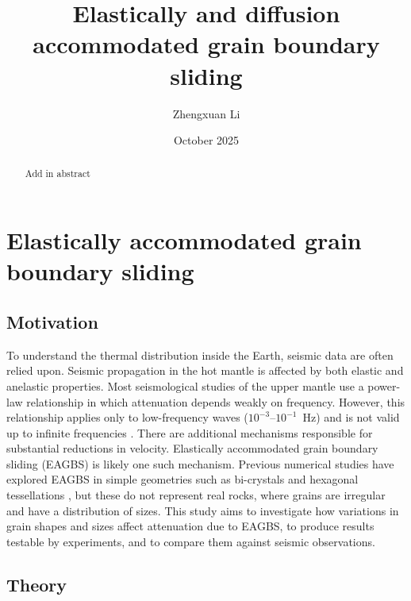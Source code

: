 \documentclass[12pt]{article}
\title{Elastically and diffusion accommodated grain boundary sliding}
\author{Zhengxuan Li}
\date{October 2025}
\begin{document}
\maketitle

\begin{abstract}
Add in abstract
\end{abstract}
\section{Elastically accommodated grain boundary sliding}
\subsection{Motivation}
To understand the thermal distribution inside the Earth, seismic data are often relied upon. Seismic propagation in the hot mantle is affected by both elastic and anelastic properties. Most seismological studies of the upper mantle use a power-law relationship in which attenuation depends weakly on frequency. However, this relationship applies only to low-frequency waves ($10^{-3}$–$10^{-1}$~Hz) and is not valid up to infinite frequencies \citep{karato_causality_2025}. There are additional mechanisms responsible for substantial reductions in velocity. Elastically accommodated grain boundary sliding (EAGBS) is likely one such mechanism. Previous numerical studies have explored EAGBS in simple geometries such as bi-crystals \citep{ghahremani_effect_1980} and hexagonal tessellations \citep{lee_anelasticity_2010}, but these do not represent real rocks, where grains are irregular and have a distribution of sizes. This study aims to investigate how variations in grain shapes and sizes affect attenuation due to EAGBS, to produce results testable by experiments, and to compare them against seismic observations.

\subsection{Theory}
\end{document}
